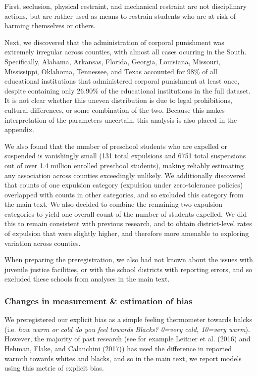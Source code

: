 \documentclass[english,floatsintext,man]{apa6}
\theoremstyle{definition}
\theoremstyle{definition}
\theoremstyle{remark}
\begin{document}
First, seclusion, physical restraint, and mechanical restraint are not
disciplinary actions, but are rather used as means to restrain students
who are at risk of harming themselves or others.

Next, we discovered that the administration of corporal punishment was
extremely irregular across counties, with almost all cases ocurring in
the South. Specifically, Alabama, Arkansas, Florida, Georgia, Louisiana,
Missouri, Mississippi, Oklahoma, Tennessee, and Texas accounted for 98\%
of all educational institutions that administered corporal punishment at
least once, despite containing only 26.90\% of the educational
institutions in the full dataset. It is not clear whether this uneven
distribution is due to legal prohibitions, cultural differences, or some
combination of the two. Because this makes interpretation of the
parameters uncertain, this analysis is also placed in the appendix.

We also found that the number of preschool students who are expelled or
suspended is vanishingly small (131 total expulsions and 6751 total
suspensions out of over 1.4 million enrolled preschool students), making
reliably estimating any association across counties exceedingly
unlikely. We additionally discovered that counts of one expulsion
category (expulsion under zero-tolerance policies) overlapped with
counts in other categories, and so excluded this category from the main
text. We also decided to combine the remaining two expulsion categories
to yield one overall count of the number of students expelled. We did
this to remain consistent with previous research, and to obtain
district-level rates of expulsion that were slightly higher, and
therefore more amenable to exploring variation across counties.

When preparing the preregistration, we also had not known about the
issues with juvenile justice facilities, or with the school districts
with reporting errors, and so excluded these schools from analyses in
the main text.

\subsubsection{Changes in measurement \& estimation of
bias}\label{changes-in-measurement-estimation-of-bias}

We preregistered our explicit bias as a simple feeling thermometer
towards balcks (i.e. \emph{how warm or cold do you feel towards Blacks?
0=very cold, 10=very warm}). However, the majority of past research (see
for example Leitner et al. (2016) and Hehman, Flake, and Calanchini
(2017)) has used the difference in reported warmth towards whites and
blacks, and so in the main text, we report models using this metric of
explicit bias.
\end{document}

